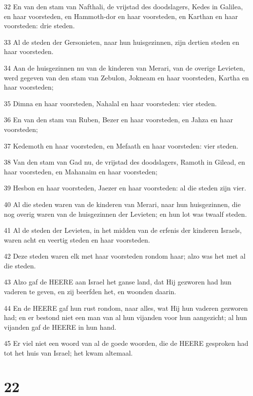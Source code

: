 \par 32 En van den stam van Nafthali, de vrijstad des doodslagers, Kedes in Galilea, en haar voorsteden, en Hammoth-dor en haar voorsteden, en Karthan en haar voorsteden: drie steden.
\par 33 Al de steden der Gersonieten, naar hun huisgezinnen, zijn dertien steden en haar voorsteden.
\par 34 Aan de huisgezinnen nu van de kinderen van Merari, van de overige Levieten, werd gegeven van den stam van Zebulon, Jokneam en haar voorsteden, Kartha en haar voorsteden;
\par 35 Dimna en haar voorsteden, Nahalal en haar voorsteden: vier steden.
\par 36 En van den stam van Ruben, Bezer en haar voorsteden, en Jahza en haar voorsteden;
\par 37 Kedemoth en haar voorsteden, en Mefaath en haar voorsteden: vier steden.
\par 38 Van den stam van Gad nu, de vrijstad des doodslagers, Ramoth in Gilead, en haar voorsteden, en Mahanaim en haar voorsteden;
\par 39 Hesbon en haar voorsteden, Jaezer en haar voorsteden: al die steden zijn vier.
\par 40 Al die steden waren van de kinderen van Merari, naar hun huisgezinnen, die nog overig waren van de huisgezinnen der Levieten; en hun lot was twaalf steden.
\par 41 Al de steden der Levieten, in het midden van de erfenis der kinderen Israels, waren acht en veertig steden en haar voorsteden.
\par 42 Deze steden waren elk met haar voorsteden rondom haar; alzo was het met al die steden.
\par 43 Alzo gaf de HEERE aan Israel het ganse land, dat Hij gezworen had hun vaderen te geven, en zij beerfden het, en woonden daarin.
\par 44 En de HEERE gaf hun rust rondom, naar alles, wat Hij hun vaderen gezworen had; en er bestond niet een man van al hun vijanden voor hun aangezicht; al hun vijanden gaf de HEERE in hun hand.
\par 45 Er viel niet een woord van al de goede woorden, die de HEERE gesproken had tot het huis van Israel; het kwam altemaal.

\chapter{22}

